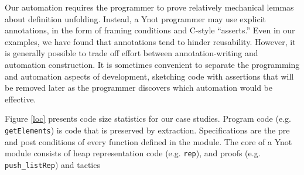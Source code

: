 \documentclass[preprint,nocopyrightspace]{sigplanconf}
\newcommand{\cd}[1]{\texttt{#1}}
\begin{document}
Our automation requires the programmer to prove relatively mechanical
lemmas about definition unfolding.  Instead, a Ynot programmer may use
explicit annotations, in the form of framing conditions and C-style
``asserts.''  Even in our examples, we have found that annotations
tend to hinder reusability.  However, it is generally possible to
trade off effort between annotation-writing and automation
construction.  It is sometimes convenient to separate the programming
and automation aspects of development, sketching code with assertions
that will be removed later as the programmer discovers which
automation would be effective.

Figure \ref{loc} presents code size statistics for our case studies.
Program code (e.g. \cd{getElements}) is code that is preserved by extraction.
Specifications are the pre and post conditions of every function
defined in the module.  The core of a Ynot module consists of heap representation code
(e.g. \cd{rep}), and proofs (e.g. \cd{push\_listRep}) and tactics
\end{document}
